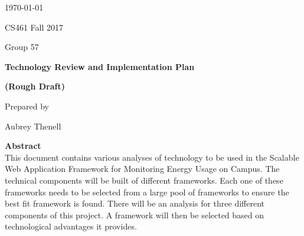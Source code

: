 \documentclass[onecolumn, draftclsnofoot,10pt, compsoc]{IEEEtran}
\newcommand{\NameSigPair}[1]{\par
\makebox[2.75in][r]{#1} \hfil 	\makebox[3.25in]{\makebox[2.25in]{\hrulefill} \hfill		\makebox[.75in]{\hrulefill}}
\par\vspace{-12pt} \textit{\tiny\noindent
\makebox[2.75in]{} \hfil		\makebox[3.25in]{\makebox[2.25in][r]{Signature} \hfill	\makebox[.75in][r]{Date}}}}
\renewcommand{\NameSigPair}[1]{#1}
\begin{document}
\begin{titlepage}
    \begin{singlespace}
        \hfill 
        \par\vspace{.2in}
        \centering
        \scshape{
            {\large\today}\par
			{\large CS461 Fall 2017}\par
			{\large Group 57}\par
            \vspace{2.5in}
            \textbf{\Huge{Technology Review and Implementation Plan}}\par
			\textbf{\Huge{(Rough Draft)}}\par
            \vspace{2.5in}
            {\large Prepared by }\par
            \vspace{5pt}
            {\Large
                \NameSigPair{Aubrey Thenell}\par
			\vfill
			\textbf{Abstract} \\
            \indent 
				This document contains various analyses of technology to be used in the Scalable Web Application Framework for Monitoring Energy Usage on Campus. The technical components will be built of different frameworks. Each one of these frameworks needs to be selected from a large pool of frameworks to ensure the best fit framework is found. There will be an analysis for three different components of this project. A framework will then be selected based on technological advantages it provides.
            }
            \vspace{20pt}
        }
      
    \end{singlespace}
\end{titlepage}
\newpage
{}
\tableofcontents
\clearpage
\end{document}
